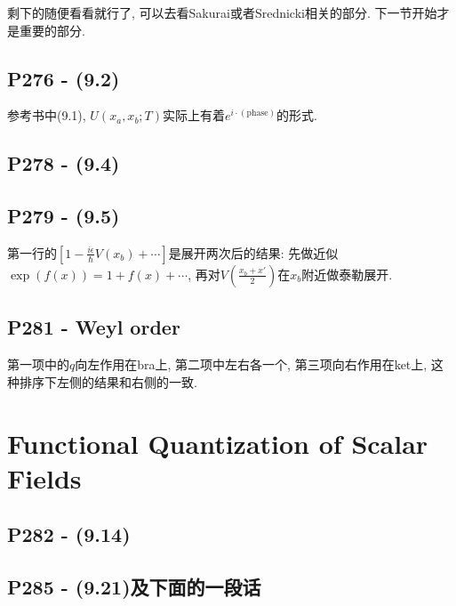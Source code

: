 剩下的随便看看就行了, 可以去看Sakurai或者Srednicki相关的部分.
下一节开始才是重要的部分.

\subsection{P276 - (9.2)}

参考书中(9.1), $U(x_a, x_b; T)$实际上有着$e^{i \cdot (\text{phase})}$的形式.

\subsection{P278 - (9.4)}


\subsection{P279 - (9.5)}

第一行的$[1-\frac{i\epsilon}{\hbar}V(x_b)+\cdots]$是展开两次后的结果: 先做近似$\exp(f(x)) = 1 + f(x) + \cdots$, 再对$V(\frac{x_b + x'}{2})$在$x_b$附近做泰勒展开.

\subsection{P281 - Weyl order}

第一项中的$q$向左作用在bra上, 第二项中左右各一个, 第三项向右作用在ket上, 这种排序下左侧的结果和右侧的一致.

\section{Functional Quantization of Scalar Fields}

\subsection{P282 - (9.14)}


\subsection{P285 - (9.21)及下面的一段话}

